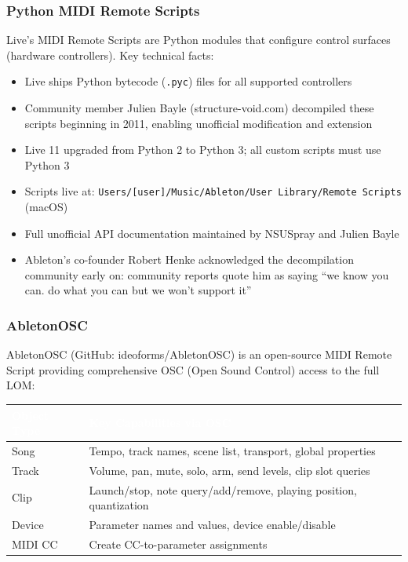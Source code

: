 \documentclass[11pt,letterpaper]{article}
\newcommand{\tableheader}[1]{\textbf{\sffamily\textcolor{white}{#1}}}
\begin{document}
\subsubsection{Python MIDI Remote Scripts}

Live's MIDI Remote Scripts are Python modules that configure control surfaces (hardware
controllers). Key technical facts:
\begin{itemize}[leftmargin=1.5em]
  \item Live ships Python bytecode (\texttt{.pyc}) files for all supported controllers
  \item Community member Julien Bayle (structure-void.com) decompiled these scripts beginning
  in 2011, enabling unofficial modification and extension
  \item Live 11 upgraded from Python 2 to Python 3; all custom scripts must use Python 3
  \item Scripts live at: \texttt{Users/[user]/Music/Ableton/User Library/Remote Scripts} (macOS)
  \item Full unofficial API documentation maintained by NSUSpray and Julien Bayle
  \item Ableton's co-founder Robert Henke acknowledged the decompilation community early on:
  community reports quote him as saying ``we know you can. do what you can but we won't support it''
\end{itemize}

\subsubsection{AbletonOSC}

AbletonOSC (GitHub: ideoforms/AbletonOSC) is an open-source MIDI Remote Script providing
comprehensive OSC (Open Sound Control) access to the full LOM:

\begin{center}
\begin{tabularx}{\textwidth}{L{3.5cm}X}
\toprule
{}
\tableheader{Object Type} & \tableheader{Key Capabilities via OSC} \\
\midrule
Song & Tempo, track names, scene list, transport, global properties \\
Track & Volume, pan, mute, solo, arm, send levels, clip slot queries \\
Clip & Launch/stop, note query/add/remove, playing position, quantization \\
Device & Parameter names and values, device enable/disable \\
MIDI CC & Create CC-to-parameter assignments \\
\bottomrule
\end{tabularx}
\end{center}
\end{document}
